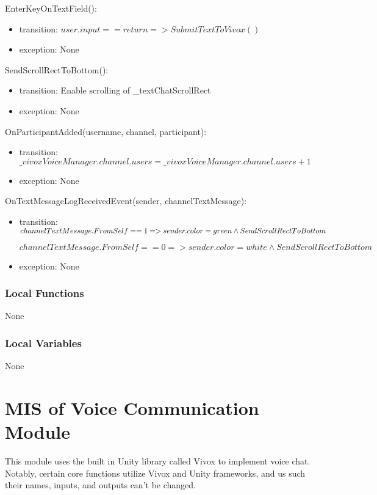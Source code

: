 \documentclass[12pt, titlepage]{article}
\begin{document}
\noindent EnterKeyOnTextField():
\begin{itemize}
\item transition: $user.input == return =>  SubmitTextToVivox()$
\item exception: None
\end{itemize}

\noindent SendScrollRectToBottom():
\begin{itemize}
\item transition: Enable scrolling of \_textChatScrollRect
\item exception: None
\end{itemize}

\noindent OnParticipantAdded(username, channel, participant):
\begin{itemize}
\item transition: $\_vivoxVoiceManager.channel.users = \_vivoxVoiceManager.channel.users + 1$
\item exception: None
\end{itemize}

\noindent OnTextMessageLogReceivedEvent(sender, channelTextMessage):
\begin{itemize}
\item transition: $channelTextMessage.FromSelf == 1 => sender.color = green \newline \land SendScrollRectToBottom$

$channelTextMessage.FromSelf == 0 => sender.color = white \land SendScrollRectToBottom$
\item exception: None
\end{itemize}

\subsubsection{Local Functions}
None

\subsubsection{Local Variables}
None


\newpage

\section{MIS of Voice Communication Module} \label{sec:voice} 
This module uses the built in Unity library called Vivox to implement voice chat. Notably, certain core functions utilize Vivox and Unity frameworks, and us such their names, inputs, and outputs can't be changed. 
\end{document}

